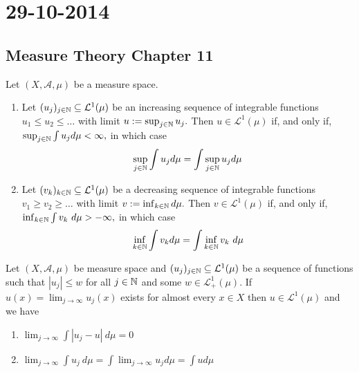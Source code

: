 \section{29-10-2014}
\subsection{Measure Theory Chapter 11}

\begin{thm}
Let \((X,\mathcal{A},\mu )\) be a measure space.

\begin{enumerate}
  \item Let \((u_{j})_{j\in \Bbb{N}}\subseteq \mathcal{L}^1(\mu )\) be an increasing sequence of integrable functions \(u_{1}\leq u_{2}\leq \ldots \) with limit \(u:=\sup_{j\in \Bbb{N}}u_{j}.\) Then \(u\in \mathcal{L}^1(\mu )\) if, and only if, \(\sup_{j\in \Bbb{N}} \int  u_{j} d\mu <\infty ,\) in which case
\[
\sup_{j\in \Bbb{N}} \int  u_{j} d\mu  = \int  \sup_{j\in \Bbb{N}} u_{j} d\mu 
\]
  \item Let \((v_{k})_{k\in \Bbb{N}}\subseteq \mathcal{L}^1(\mu )\) be a decreasing sequence of integrable functions \(v_{1}\geq v_{2}\geq  \ldots  \) with limit \(v:=\inf_{k\in \Bbb{N}}d\mu .\) Then \(v\in \mathcal{L}^1(\mu )\) if, and only if, \(\inf_{k\in \Bbb{N}}\int v_{k}\  d\mu >-\infty ,\) in which case
\[
\inf_{k\in \Bbb{N}}\int v_{k} d\mu  = \int  \inf_{k\in \Bbb{N}}v_{k}\  d\mu 
\]
\end{enumerate}
\end{thm}

\begin{thm}
Let \((X,\mathcal{A},\mu )\) be measure space and \((u_{j})_{j\in \Bbb{N}}\subseteq \mathcal{L}^1(\mu )\) be a sequence of functions such that \(|u_{j}|\leq w\) for all \(j\in \Bbb{N}\) and some \(w\in \mathcal{L}_{+}^1(\mu ).\) If \(u(x)=\lim_{j\rightarrow \infty }u_{j}(x)\) exists for almost every \(x\in X\) then \(u\in \mathcal{L}^1(\mu )\) and we have

\begin{enumerate}
  \item \(\lim_{j\rightarrow \infty } \int |u_{j}-u|\  d\mu =0\)
  \item \(\lim_{j\rightarrow \infty } \int  u_{j}\  d\mu  = \int  \lim_{j\rightarrow \infty } u_{j} d\mu  =\int  u d\mu \)
\end{enumerate}

\end{thm}

